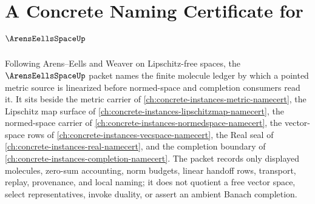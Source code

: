 \chapter{A Concrete Naming Certificate for $\ArensEellsSpaceUp$}
\label{ch:concrete-instances-arens-eells-space-namecert}

Following Arens--Eells and Weaver on Lipschitz-free spaces, the $\ArensEellsSpaceUp$ packet names the finite molecule ledger by which a pointed metric source is linearized before normed-space and completion consumers read it. It sits beside the metric carrier of \autoref{ch:concrete-instances-metric-namecert}, the Lipschitz map surface of \autoref{ch:concrete-instances-lipschitzmap-namecert}, the normed-space carrier of \autoref{ch:concrete-instances-normedspace-namecert}, the vector-space rows of \autoref{ch:concrete-instances-vecspace-namecert}, the Real seal of \autoref{ch:concrete-instances-real-namecert}, and the completion boundary of \autoref{ch:concrete-instances-completion-namecert}. The packet records only displayed molecules, zero-sum accounting, norm budgets, linear handoff rows, transport, replay, provenance, and local naming; it does not quotient a free vector space, select representatives, invoke duality, or assert an ambient Banach completion.

